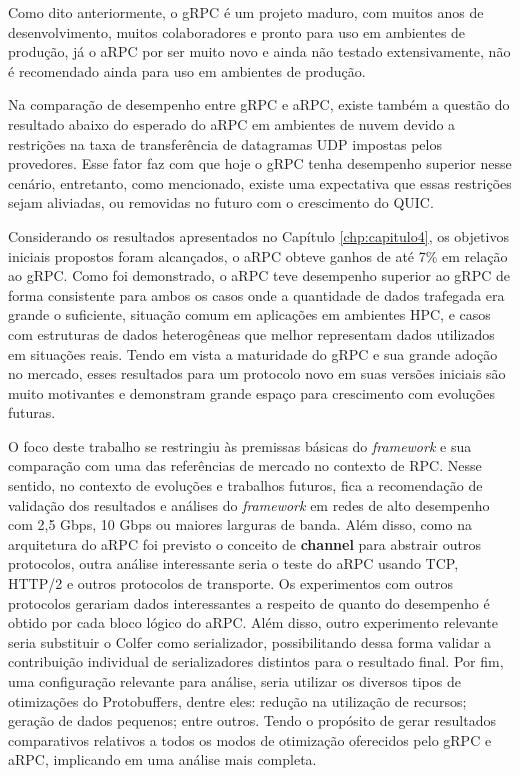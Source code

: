 Como dito anteriormente, o gRPC é um projeto maduro, com muitos anos de desenvolvimento, muitos colaboradores e pronto para uso em ambientes de produção, já o aRPC por ser muito novo e ainda não testado extensivamente, não é recomendado ainda para uso em ambientes de produção.

Na comparação de desempenho entre gRPC e aRPC, existe também a questão do resultado abaixo do esperado do aRPC em ambientes de nuvem devido a restrições na taxa de transferência de datagramas UDP impostas pelos provedores. Esse fator faz com que hoje o gRPC tenha desempenho superior nesse cenário, entretanto, como mencionado, existe uma expectativa que essas restrições sejam aliviadas, ou removidas no futuro com o crescimento do QUIC.

Considerando os resultados apresentados no Capítulo \ref{chp:capitulo4}, os objetivos iniciais propostos foram alcançados, o aRPC obteve ganhos de até 7\% em relação ao gRPC. Como foi demonstrado, o aRPC teve desempenho superior ao gRPC de forma consistente para ambos os casos onde a quantidade de dados trafegada era grande o suficiente, situação comum em aplicações em ambientes HPC, e casos com estruturas de dados heterogêneas que melhor representam dados utilizados em situações reais. Tendo em vista a maturidade do gRPC e sua grande adoção no mercado, esses resultados para um protocolo novo em suas versões iniciais são muito motivantes e demonstram grande espaço para crescimento com evoluções futuras. 

O foco deste trabalho se restringiu às premissas básicas do \textit{framework} e sua comparação com uma das referências de mercado no contexto de RPC. Nesse sentido, no contexto de evoluções e trabalhos futuros, fica a recomendação de validação dos resultados e análises do \textit{framework} em redes de alto desempenho com 2,5 Gbps, 10 Gbps ou maiores larguras de banda. Além disso, como na arquitetura do aRPC foi previsto o conceito de \textbf{channel} para abstrair outros protocolos, outra análise interessante seria o teste do aRPC usando TCP, HTTP/2 e outros protocolos de transporte. Os experimentos com outros protocolos gerariam dados interessantes a respeito de quanto do desempenho é obtido por cada bloco lógico do aRPC. Além disso, outro experimento relevante seria substituir o Colfer como serializador, possibilitando dessa forma validar a contribuição individual de serializadores distintos para o resultado final. Por fim, uma configuração relevante para análise, seria utilizar os diversos tipos de otimizações do Protobuffers, dentre eles: redução na utilização de recursos; geração de dados pequenos; entre outros. Tendo o propósito de gerar resultados comparativos relativos a todos os modos de otimização oferecidos pelo gRPC e aRPC, implicando em uma análise mais completa.

